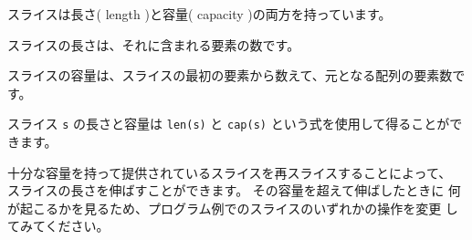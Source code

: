 スライスは長さ( length )と容量( capacity )の両方を持っています。

スライスの長さは、それに含まれる要素の数です。

スライスの容量は、スライスの最初の要素から数えて、元となる配列の要素数です。

スライス \texttt{s} の長さと容量は \texttt{len(s)} と
\texttt{cap(s)} という式を使用して得ることができます。

十分な容量を持って提供されているスライスを再スライスすることによって、
スライスの長さを伸ばすことができます。 その容量を超えて伸ばしたときに
何が起こるかを見るため、プログラム例でのスライスのいずれかの操作を変更
してみてください。